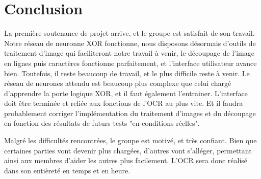 \documentclass[12pt]{report}
\begin{document}
\chapter{Conclusion}

La première soutenance de projet arrive, et le groupe est satisfait de son travail. Notre réseau de neuronne XOR fonctionne, nous disposons désormais d'outils de traitement d'image qui faciliteront notre travail à venir, le découpage de l'image en lignes puis caractères fonctionne parfaitement, et l'interface utilisateur avance bien. Toutefois, il reste beaucoup de travail, et le plus difficile reste à venir. Le réseau de neurones attendu est beaucoup plus complexe que celui chargé d'apprendre la porte logique XOR, et il faut également l'entrainer. L'interface doit être terminée et reliée aux fonctions de l'OCR au plus vite. Et il faudra probablement corriger l'implémentation du traitement d'images et du découpage en fonction des résultats de futurs tests "en conditions réelles".

Malgré les difficultés rencontrées, le groupe est motivé, et très confiant. Bien que certaines parties vont devenir plus chargées, d'autres vont s'alléger, permettant ainsi aux membres d'aider les autres plus facilement. L'OCR sera donc réalisé dans son entièreté en temps et en heure.

\vfill

\end{document}
